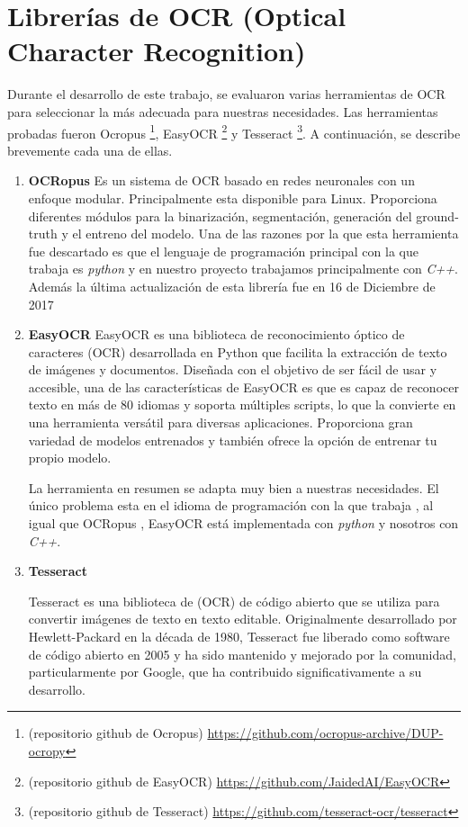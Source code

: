 	
\section{Librerías de OCR (Optical Character Recognition)}
\label{sec:Seleccion de libreria de OCR}
Durante el desarrollo de este trabajo, se evaluaron varias herramientas de OCR para seleccionar la más adecuada para nuestras necesidades. Las herramientas probadas fueron Ocropus	\footnote{(repositorio github de Ocropus) \url{https://github.com/ocropus-archive/DUP-ocropy} }, EasyOCR	\footnote{(repositorio github de EasyOCR) \url{https://github.com/JaidedAI/EasyOCR} } y Tesseract	\footnote{(repositorio github de Tesseract) \url{https://github.com/tesseract-ocr/tesseract} }. A continuación, se describe brevemente cada una de ellas.
\begin{enumerate}
	\item \textbf{OCRopus}
	Es un sistema de OCR basado en redes neuronales con un enfoque modular.
	Principalmente esta disponible para Linux. Proporciona diferentes módulos para la binarización, segmentación, generación del ground-truth y el entreno del modelo.
	Una de las razones por la que esta herramienta fue descartado es que el lenguaje de programación principal con la que trabaja es \emph{python} y en nuestro proyecto trabajamos principalmente con \emph{C++}. Además la última actualización de esta librería fue en 16 de Diciembre de 2017
	
	\item \textbf{EasyOCR}
	EasyOCR es una biblioteca de reconocimiento óptico de caracteres (OCR) desarrollada en Python que facilita la extracción de texto de imágenes y documentos. Diseñada con el objetivo de ser fácil de usar y accesible, una de las características de EasyOCR es que es capaz de reconocer texto en más de 80 idiomas y soporta múltiples scripts, lo que la convierte en una herramienta versátil para diversas aplicaciones.
	Proporciona gran variedad de modelos entrenados y también ofrece la opción de entrenar tu propio modelo.
	
	La herramienta en resumen se adapta muy bien a nuestras necesidades. El único problema esta en el idioma de programación con la que trabaja , al igual que OCRopus , EasyOCR está implementada con \emph{python} y nosotros con \emph{C++}.
	
	\item \textbf{Tesseract}
	
	Tesseract es una biblioteca de (OCR) de código abierto que se utiliza para convertir imágenes de texto en texto editable. Originalmente desarrollado por Hewlett-Packard en la década de 1980, Tesseract fue liberado como software de código abierto en 2005 y ha sido mantenido y mejorado por la comunidad, particularmente por Google, que ha contribuido significativamente a su desarrollo.
	

\end{enumerate}
